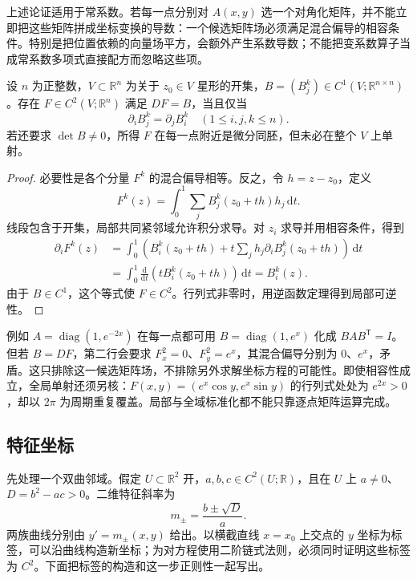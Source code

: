\ProseParagraphBreak

上述论证适用于常系数。若每一点分别对 \(A(x,y)\) 选一个对角化矩阵，并不能立即把这些矩阵拼成坐标变换的导数：一个候选矩阵场必须满足混合偏导的相容条件。特别是把位置依赖的向量场平方，会额外产生系数导数；不能把变系数算子当成常系数多项式直接配方而忽略这些项。

\begin{proposition}[候选坐标导数的相容性]\label{b2:prop:08-coordinate-integrability}
设 \(n\) 为正整数，\(V\subset\mathbb R^n\) 为关于 \(z_0\in V\) 星形的开集，\(B=(B^k_j)\in C^1(V;\mathbb R^{n\times n})\)。存在 \(F\in C^2(V;\mathbb R^n)\) 满足 \(DF=B\)，当且仅当
\[
 \partial_iB^k_j=\partial_jB^k_i\quad(1\leq i,j,k\leq n).
\]
若还要求 \(\det B\ne0\)，所得 \(F\) 在每一点附近是微分同胚，但未必在整个 \(V\) 上单射。
\end{proposition}
\begin{proof}
必要性是各个分量 \(F^k\) 的混合偏导相等。反之，令 \(h=z-z_0\)，定义
\[
 F^k(z)=\int_0^1\sum_jB^k_j(z_0+th)h_j\,\mathrm{d}t.
\]
线段包含于开集，局部共同紧邻域允许积分求导。对 \(z_i\) 求导并用相容条件，得到
\[
 \begin{aligned}
 \partial_iF^k(z)
 &=\int_0^1\left(B^k_i(z_0+th)
       +t\sum_jh_j\partial_iB^k_j(z_0+th)\right)\,\mathrm{d}t\\
 &=\int_0^1\frac{\mathrm{d}}{\mathrm{d}t}
       \left(tB^k_i(z_0+th)\right)\,\mathrm{d}t=B^k_i(z).
 \end{aligned}
\]
由于 \(B\in C^1\)，这个等式使 \(F\in C^2\)。行列式非零时，用逆函数定理得到局部可逆性。
\end{proof}

例如 \(A=\operatorname{diag}(1,e^{-2x})\) 在每一点都可用 \(B=\operatorname{diag}(1,e^x)\) 化成 \(BAB^{\mathsf T}=I\)。但若 \(B=DF\)，第二行会要求 \(F^2_x=0\)、\(F^2_y=e^x\)，其混合偏导分别为 \(0\)、\(e^x\)，矛盾。这只排除这一候选矩阵场，不排除另外求解坐标方程的可能性。即使相容性成立，全局单射还须另核：\(F(x,y)=(e^x\cos y,e^x\sin y)\) 的行列式处处为 \(e^{2x}>0\)，却以 \(2\pi\) 为周期重复覆盖。局部与全域标准化都不能只靠逐点矩阵运算完成。

\subsection{特征坐标}
\label{b2:subsec:080302}

先处理一个双曲邻域。假定 \(U\subset\mathbb R^2\) 开，\(a,b,c\in C^2(U;\mathbb R)\)，且在 \(U\) 上 \(a\ne0\)、\(D=b^2-ac>0\)。二维特征斜率为
\[
 m_\pm=\frac{b\pm\sqrt D}{a}.
\]
两族曲线分别由 \(y'=m_\pm(x,y)\) 给出。以横截直线 \(x=x_0\) 上交点的 \(y\) 坐标为标签，可以沿曲线构造新坐标；为对方程使用二阶链式法则，必须同时证明这些标签为 \(C^2\)。下面把标签的构造和这一步正则性一起写出。

